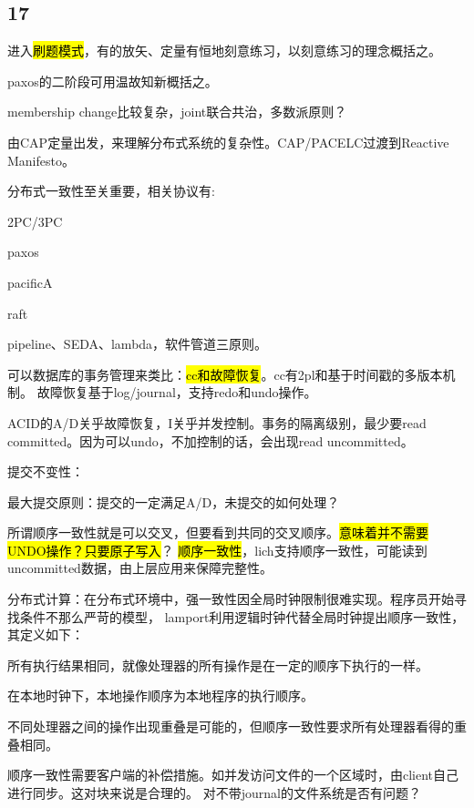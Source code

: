 \subsection{17}

\hrulefill

进入\hl{刷题模式}，有的放矢、定量有恒地刻意练习，以刻意练习的理念概括之。

paxos的二阶段可用温故知新概括之。

membership change比较复杂，joint联合共治，多数派原则？

由CAP定量出发，来理解分布式系统的复杂性。CAP/PACELC过渡到Reactive Manifesto。

分布式一致性至关重要，相关协议有:
\begin{enumbox}
\item 2PC/3PC
\item paxos
\item pacificA
\item raft
\end{enumbox}

pipeline、SEDA、lambda，软件管道三原则。

可以数据库的事务管理来类比：\hl{cc和故障恢复}。cc有2pl和基于时间戳的多版本机制。
故障恢复基于log/journal，支持redo和undo操作。

ACID的A/D关乎故障恢复，I关乎并发控制。事务的隔离级别，最少要read committed。因为可以undo，不加控制的话，会出现read uncommitted。

提交不变性：

最大提交原则：提交的一定满足A/D，未提交的如何处理？

所谓顺序一致性就是可以交叉，但要看到共同的交叉顺序。\hl{意味着并不需要UNDO操作？只要原子写入}？
\hl{顺序一致性}，lich支持顺序一致性，可能读到uncommitted数据，由上层应用来保障完整性。

分布式计算：在分布式环境中，强一致性因全局时钟限制很难实现。程序员开始寻找条件不那么严苛的模型，
lamport利用逻辑时钟代替全局时钟提出顺序一致性，其定义如下：
\begin{enumbox}
\item 所有执行结果相同，就像处理器的所有操作是在一定的顺序下执行的一样。
\item 在本地时钟下，本地操作顺序为本地程序的执行顺序。
\end{enumbox}

不同处理器之间的操作出现重叠是可能的，但顺序一致性要求所有处理器看得的重叠相同。

顺序一致性需要客户端的补偿措施。如并发访问文件的一个区域时，由client自己进行同步。这对块来说是合理的。
对不带journal的文件系统是否有问题？

